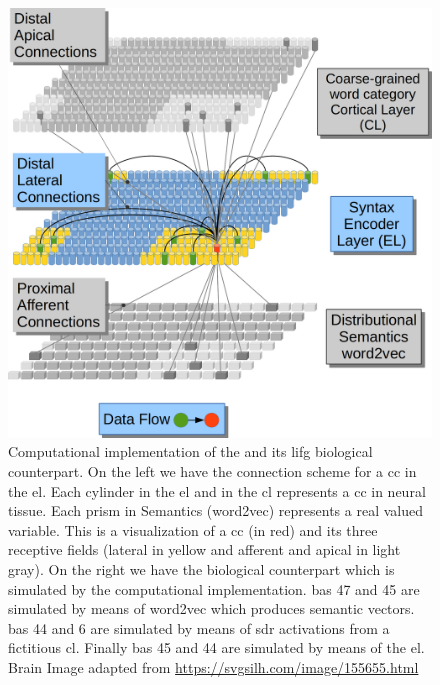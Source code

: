 {\begin{figure}[h!]
    \centering
    \includegraphics[width=1.0\textwidth]{EncoderConnections.png}
    \caption{Computational implementation of the  and its \gls{lifg} biological counterpart.
    On the left we have the connection scheme for a \gls{cc} in the \gls{el}.
	    Each cylinder in the \gls{el} and in the \gls{cl} represents a \gls{cc} in neural tissue.
	    Each prism in Semantics (word2vec) represents a real valued variable.
	    This is a visualization of a \gls{cc} (in red) and its three receptive fields (lateral in yellow and afferent and apical in light gray).
    On the right we have the biological counterpart which is simulated by the computational implementation.
        \glspl{ba} 47 and 45 are simulated by means of word2vec which produces semantic vectors.
        \glspl{ba} 44 and 6 are simulated by means of \gls{sdr} activations from a fictitious \gls{cl}.
        Finally \glspl{ba} 45 and 44 are simulated by means of the \gls{el}.
	Brain Image adapted from \url{https://svgsilh.com/image/155655.html}}
    \label{fig:EncoderConnections}
\end{figure}

}
